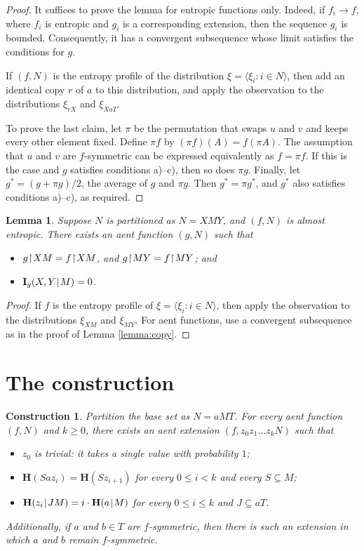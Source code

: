\documentclass[a4paper]{IEEEtran}
\let\>\rangle\let\<\langle
\def\|{\mskip1.5mu{|}\mskip1.5mu}
\def\H{\mathbf H}
\def\I{\mathbf I}
\newcommand\restr{\mkern1mu{\upharpoonright}\mkern1mu}
\def\<{\langle}\def\>{\rangle}
\newtheorem{lemma}[theorem]{Lemma}
\newtheorem{construction}{Construction}
\theoremstyle{definition}
\begin{document}
\begin{proof}
It suffices to prove the lemma for entropic functions only. Indeed, if $f_i\to
f$, where $f_i$ is entropic and $g_i$ is a corresponding extension, then
the sequence $g_i$ is bounded. Consequently, it has a convergent subsequence
whose limit satisfies the conditions for $g$.

If $(f,N)$ is the entropy profile of the distribution $\xi=\<\xi_i:i\in
N\>$, then add an identical copy $r$ of $a$ to this distribution, and apply
the observation to the distributions $\xi_{rX}$ and $\xi_{XaT}$.

To prove the last claim, let $\pi$ be the permutation that swaps $u$
and $v$ and keeps every other element fixed. Define $\pi f$ by $(\pi
f)(A)=f(\pi A)$. The assumption that $u$ and $v$ are
$f$-symmetric can be expressed equivalently as $f=\pi f$. If this is the
case and $g$ satisfies conditions a)--c), then so does $\pi g$. Finally,
let $g^*=(g+\pi g)/2$, the average of $g$ and $\pi g$. Then $g^*=\pi g^*$,
and $g^*$ also satisfies conditions a)--c), as required.
\end{proof}

\begin{lemma}\label{lemma:maxe}
Suppose $N$ is partitioned as $N=XMY$, and $(f,N)$ is almost entropic.
There exists an aent function $(g,N)$ such that
\begin{itemize}
\item[a)] $g\restr XM = f\restr XM$, and $g\restr MY=f\restr MY$; and
\item[b)] $\I_g(X,Y\|M)=0$.
\end{itemize}
\end{lemma}
\begin{proof}
If $f$ is the entropy profile of $\xi=\<\xi_i:i\in N\>$, then apply the
observation to the distributions $\xi_{XM}$ and $\xi_{MY}$. For aent functions,
use a convergent subsequence as in the proof of Lemma \ref{lemma:copy}.
\end{proof}


\section{The construction}\label{sec:construction}

\begin{construction}\label{defz}
Partition the base set as $N=aMT$. For every aent function $(f,N)$ and $k\ge 0$,
there exists an aent extension $(f,z_0z_1\dots z_kN)$ such that
\begin{itemize}
\item[a)] $z_0$ is trivial: it takes a single value with probability $1$;
\item[b)] $\H(Saz_i) = \H(Sz_{i+1})$ for every $0\le i<k$ and every $S\subseteq M$;
\item[c)] $\H(z_i\|JM)=i\cdot\H(a\|M)$ for every $0\le i\le k$ and $J\subseteq aT$.
\end{itemize}
Additionally, if $a$ and $b\in T$ are $f$-symmetric, then there
is such an extension in which $a$ and $b$ remain $f$-symmetric.
\end{construction}
\end{document}
